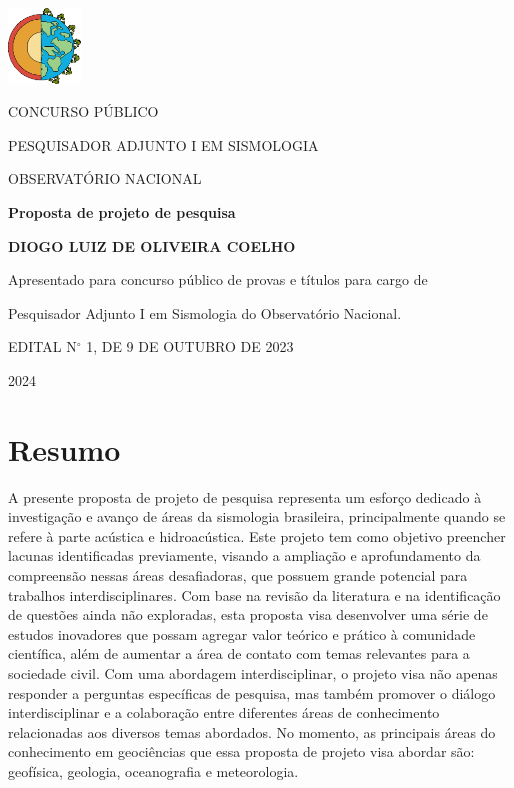 \documentclass[10pt,a4paper,oneside]{book}
\newcommand{\Year}{2024}
\newcommand{\Author}{Diogo Luiz de Oliveira Coelho}
\begin{document}
\pagestyle{plain}
\frontmatter

\begin{titlepage}
  \begin{center}
    \includegraphics[height=2cm]{images/logo_terra.png}
    \vspace{1cm}

    CONCURSO PÚBLICO
    
    PESQUISADOR ADJUNTO I EM SISMOLOGIA
    
    OBSERVATÓRIO NACIONAL

    \vspace{5cm}

    \textbf{\LARGE Proposta de projeto de pesquisa}
    \vspace{1cm}

    \textbf{\LARGE \MakeUppercase{\Author{}}}
    \vspace{5cm}

    {\small
	Apresentado para concurso público de provas e títulos para cargo de

	Pesquisador Adjunto I em Sismologia do Observatório Nacional.
      \vspace{1cm}

	EDITAL N$^{\circ}$   1, DE 9 DE OUTUBRO DE 2023
    }
    \vfill

    \Year{}
  \end{center}
\end{titlepage}

\chapter*{Resumo}

A presente proposta de projeto de pesquisa representa um esforço dedicado à investigação e avanço de áreas da sismologia brasileira, principalmente quando se refere à parte acústica e hidroacústica. Este projeto tem como objetivo preencher lacunas identificadas previamente, visando a ampliação e aprofundamento da compreensão nessas áreas desafiadoras, que possuem grande potencial para trabalhos interdisciplinares. Com base na revisão da literatura e na identificação de questões ainda não exploradas, esta proposta visa desenvolver uma série de estudos inovadores que possam agregar valor teórico e prático à comunidade científica, além de aumentar a área de contato com temas relevantes para a sociedade civil. Com uma abordagem interdisciplinar, o projeto visa não apenas responder a perguntas específicas de pesquisa, mas também promover o diálogo interdisciplinar e a colaboração entre diferentes áreas de conhecimento relacionadas aos diversos temas abordados. No momento, as principais áreas do conhecimento em geociências que essa proposta de projeto visa abordar são: geofísica, geologia, oceanografia e meteorologia.  
\end{document}
